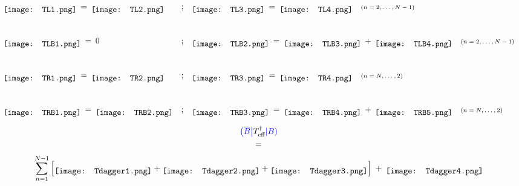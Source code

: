 \begin{equation*}
\begin{array}{l c l}
	\raisebox{-0.5\height}{\texttt{[image: TL1.png]}} 
	\:=\:
	\raisebox{-0.5\height}{\texttt{[image: TL2.png]}} 
\hspace{1em}& ; &
	\raisebox{-0.5\height}{\texttt{[image: TL3.png]}} 
	\:=\:
	\raisebox{-0.5\height}{\texttt{[image: TL4.png]}}
	\hspace{1em} \text{\scriptsize{$(n = 2, \ldots, N-1)$}}
\\[3em]
	\raisebox{-0.5\height}{\texttt{[image: TLB1.png]}} 
	\:=\: 0
& ; &
	\raisebox{-0.5\height}{\texttt{[image: TLB2.png]}} 
	\:=\: 
	\raisebox{-0.5\height}{\texttt{[image: TLB3.png]}}
	\:+\:
	\raisebox{-0.5\height}{\texttt{[image: TLB4.png]}}
	\hspace{1em} \text{\scriptsize{$(n = 2, \ldots, N-1)$}}
\\[3em]
	\raisebox{-0.5\height}{\texttt{[image: TR1.png]}} 
	\:=\:
	\raisebox{-0.5\height}{\texttt{[image: TR2.png]}} 
& ; &
	\raisebox{-0.5\height}{\texttt{[image: TR3.png]}} 
	\:=\: 
	\raisebox{-0.5\height}{\texttt{[image: TR4.png]}}
	\hspace{1em} \text{\scriptsize{$(n = N, \ldots, 2)$}}
\\[3em]
	\raisebox{-0.5\height}{\texttt{[image: TRB1.png]}} 
	\:=\:
	\raisebox{-0.5\height}{\texttt{[image: TRB2.png]}} 
& ; &
	\raisebox{-0.5\height}{\texttt{[image: TRB3.png]}} 
	\:=\: 
	\raisebox{-0.5\height}{\texttt{[image: TRB4.png]}}
	\:+\:
	\raisebox{-0.5\height}{\texttt{[image: TRB5.png]}}
	\hspace{1em} \text{\scriptsize{$(n = N, \ldots, 2)$}}
\end{array}
\end{equation*}

\newpage
\begin{align*}
\begin{split}
	\textcolor{blue}{\left( \overline{B} \right|} &T_{\text{eff}}^{\dagger} \textcolor{blue}{\left| B \right)} \\
	&=
\end{split}
\end{align*}
\vspace*{-0.5cm}
\begin{equation*}
	\sum_{n=1}^{N-1} \left[
	\raisebox{-0.45\height}{\texttt{[image: Tdagger1.png]}} 
	+
	\raisebox{-0.45\height}{\texttt{[image: Tdagger2.png]}}
	+
	\raisebox{-0.45\height}{\texttt{[image: Tdagger3.png]}} 
	\right] 
	\:+\:
	\raisebox{-0.45\height}{\texttt{[image: Tdagger4.png]}}
\end{equation*}

